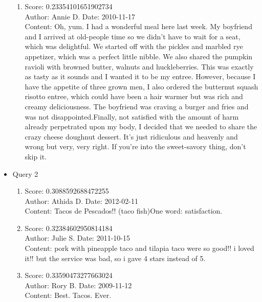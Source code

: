 \documentclass[paper=a4, fontsize=11pt]{jhwhw} %
\begin{document}
\begin{itemize}
\begin{enumerate}
            \item Score: 0.23354101651902734\\
                Author: Annie D.
                Date: 2010-11-17\\
                Content: Oh, yum. I had a wonderful meal here last week. My boyfriend and I arrived at old-people time so we didn't have to wait for a seat, which was delightful. We started off with the pickles and marbled rye appetizer, which was a perfect little nibble. We also shared the pumpkin ravioli with browned butter, walnuts and huckleberries. This was exactly as tasty as it sounds and I wanted it to be my entree. However, because I have the appetite of three grown men, I also ordered the butternut squash risotto entree, which could have been a hair warmer but was rich and creamy deliciousness. The boyfriend was craving a burger and fries and was not disappointed.Finally, not satisfied with the amount of harm already perpetrated upon my body, I decided that we needed to share the crazy cheese doughnut dessert. It's just ridiculous and heavenly and wrong but very, very right. If you're into the sweet-savory thing, don't skip it.
        \end{enumerate}
    \item Query 2
        \begin{enumerate}
            \item Score: 0.3088592688472255\\
                Author: Athida D.
                Date: 2012-02-11\\
                Content: Tacos de Pescados!! (taco fish)One word: satisfaction.

            \item Score: 0.32384602950814184\\
                Author: Julie S.
                Date: 2011-10-15\\
                Content: pork with pineapple taco and tilapia taco were so good!! i loved it!! but the service was bad, so i gave 4 stars instead of 5.

            \item Score: 0.33590473277663024\\
                Author: Rory B.
                Date: 2009-11-12\\
                Content: Best. Tacos. Ever.
        \end{enumerate}


\end{itemize}
\end{document}
